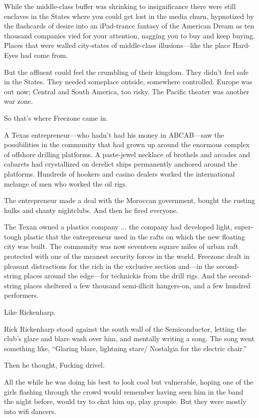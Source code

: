 While the middle-class buffer was shrinking to insignificance there were still enclaves in the States where you could get lost in the media churn, hypnotized by the flashcards of desire into an iPad-trance fantasy of the American Dream as ten thousand companies vied for your attention, nagging you to buy and keep buying. Places that were walled city-states of middle-class illusions—like the place Hard-Eyes had come from.

But the affluent could feel the crumbling of their kingdom. They didn't feel safe in the States. They needed someplace outside, somewhere controlled. Europe was out now; Central and South America, too risky. The Pacific theater was another war zone.

So that's where Freezone came in.

A Texas entrepreneur—who hadn't had his money in ABCAB—saw the possibilities in the community that had grown up around the enormous complex of offshore drilling platforms. A paste-jewel necklace of brothels and arcades and cabarets had crystallized on derelict ships permanently anchored around the platforms. Hundreds of hookers and casino dealers worked the international melange of men who worked the oil rigs.

The entrepreneur made a deal with the Moroccan government, bought the rusting hulks and shanty nightclubs. And then he fired everyone.

The Texan owned a plastics company ... the company had developed light, super-tough plastic that the entrepreneur used in the rafts on which the new floating city was built. The community was now seventeen square miles of urban raft protected with one of the meanest security forces in the world. Freezone dealt in pleasant distractions for the rich in the exclusive section and—in the second-string places around the edge—for technickis from the drill rigs. And the second-string places sheltered a few thousand semi-illicit hangers-on, and a few hundred performers.

Like Rickenharp.

Rick Rickenharp stood against the south wall of the Semiconductor, letting the club's glare and blare wash over him, and mentally writing a song. The song went something like, ``Glaring blare, lightning stare/ Nostalgia for the electric chair.''

Then he thought, Fucking drivel.

All the while he was doing his best to look cool but vulnerable, hoping one of the girls flashing through the crowd would remember having seen him in the band the night before, would try to chat him up, play groupie. But they were mostly into wifi dancers.

